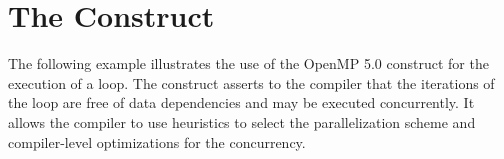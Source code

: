 \pagebreak
\section{The  Construct}
\label{sec:loop}

The following example illustrates the use of the OpenMP 5.0 
construct for the execution of a loop.
The  construct asserts to the compiler that the iterations 
of the loop are free of data dependencies and may be executed concurrently.
It allows the compiler to use heuristics to select the parallelization scheme
and compiler-level optimizations for the concurrency. 

